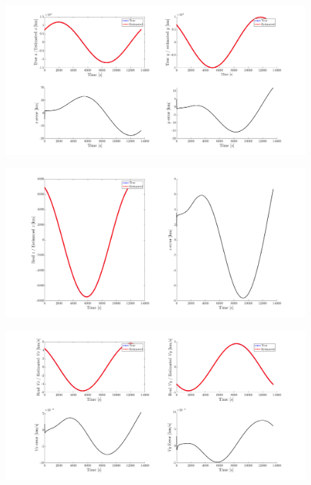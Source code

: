 \begin{figure}[H]
    \centering
    \includegraphics[width=\textwidth]{Figures/xy-error-50km-1obs.png}
    \caption{}
    \label{fig: xyerror-50-1}
\end{figure}
\begin{figure}[H]
    \centering
    \includegraphics[width=\textwidth]{Figures/z-error-50km-1obs.png}
    \caption{}
    \label{fig: zerror-50-1}
\end{figure}
\begin{figure}[H]
    \centering
    \includegraphics[width=\textwidth]{Figures/Vx-vy-error-50km-1obs.png}
    \caption{}
    \label{fig: vxyerror-50-1}
\end{figure}
